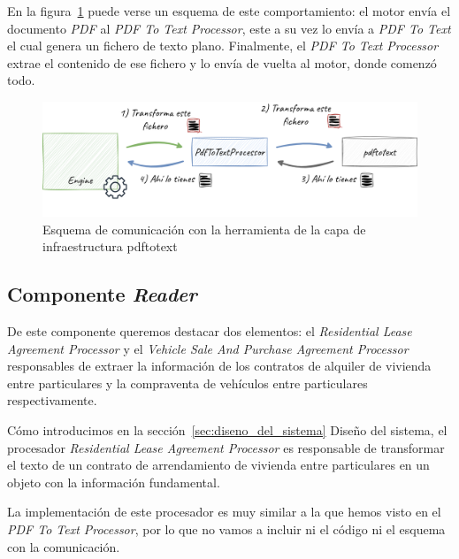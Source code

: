 En la figura~\ref{fig:chapter_4.4.generator_component_pdf_to_text_processor} puede verse un esquema de este
comportamiento: el motor envía el documento \textit{PDF} al \textit{PDF To Text Processor}, este a su vez lo envía a
\textit{PDF To Text} el cual genera un fichero de texto plano.
Finalmente, el \textit{PDF To Text Processor} extrae el contenido de ese fichero y lo envía de vuelta al motor, donde
comenzó todo.

\begin{figure}[ht]
    \begin{center}
        \includegraphics[width=\textwidth]{./chapter/4/images/chapter_4.4.generator_component_pdf_to_text_processor}
        \caption{Esquema de comunicación con la herramienta de la capa de infraestructura pdftotext}
        \label{fig:chapter_4.4.generator_component_pdf_to_text_processor}
    \end{center}
\end{figure}

\subsection*{Componente \textit{Reader}}

De este componente queremos destacar dos elementos: el \textit{Residential Lease Agreement Processor} y el
\textit{Vehicle Sale And Purchase Agreement Processor} responsables de extraer la información de los contratos de
alquiler de vivienda entre particulares y la compraventa de vehículos entre particulares respectivamente.

Cómo introducimos en la sección~\ref{sec:diseno_del_sistema} Diseño del sistema, el procesador
\textit{Residential Lease Agreement Processor} es responsable de transformar el texto de un contrato de
arrendamiento de vivienda entre particulares en un objeto con la información fundamental.

La implementación de este procesador es muy similar a la que hemos visto en el \textit{PDF To Text Processor}, por lo
que no vamos a incluir ni el código ni el esquema con la comunicación.

